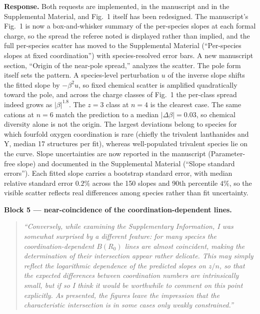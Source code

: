 \documentclass[11pt]{article}
\newenvironment{refquote}%
  {\begin{quote}\itshape\color{black!70}}%
  {\end{quote}}
\begin{document}
\textbf{Response.}  Both requests are implemented, in the manuscript
and in the Supplemental Material, and Fig.~1 itself has been
redesigned.  The manuscript's Fig.~1 is now a box-and-whisker summary
of the per-species slopes at each formal charge, so the spread the
referee noted is displayed rather than implied, and the full
per-species scatter has moved to the Supplemental Material
(``Per-species slopes at fixed coordination'') with species-resolved
error bars.  A new manuscript section, ``Origin of the near-pole
spread,'' analyzes the scatter.  The pole form itself sets the
pattern.  A species-level perturbation $u$ of the inverse slope
shifts the fitted slope by $-\beta^2 u$, so fixed chemical scatter is
amplified quadratically toward the pole, and across the charge
classes of Fig.~1 the per-class spread indeed grows as
$|\beta|^{1.8}$.  The $z=3$ class at $n=4$ is the clearest case.  The
same cations at $n=6$ match the prediction to a median
$|\Delta\beta|=0.03$, so chemical diversity alone is not the origin.
The largest deviations belong to species for which fourfold oxygen
coordination is rare (chiefly the trivalent lanthanides and Y, median
17 structures per fit), whereas well-populated trivalent species lie
on the curve.  Slope uncertainties are now reported in the manuscript
(Parameter-free slope) and documented in the Supplemental Material
(``Slope standard errors'').  Each fitted slope carries a bootstrap
standard error, with median relative standard error $0.2\%$ across
the 150 slopes and 90th percentile $4\%$, so the visible scatter
reflects real differences among species rather than fit uncertainty.

\textbf{Block 5 --- near-coincidence of the coordination-dependent
lines.}

\begin{refquote}
``Conversely, while examining the Supplementary Information, I was
somewhat surprised by a different feature: for many species the
coordination-dependent $B(R_0)$ lines are almost coincident, making
the determination of their intersection appear rather delicate.  This
may simply reflect the logarithmic dependence of the predicted slopes
on $z/n$, so that the expected differences between coordination
numbers are intrinsically small, but if so I think it would be
worthwhile to comment on this point explicitly.  As presented, the
figures leave the impression that the characteristic intersection is
in some cases only weakly constrained.''
\end{refquote}
\end{document}
